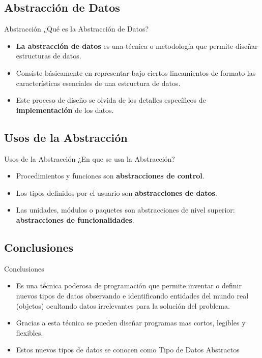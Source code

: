 \documentclass[11pt]{beamer}
\begin{document}
\subsection{Abstracción de Datos}
\begin{frame}{Abstracción}
¿Qué es la Abstracción de Datos?
\begin{itemize}[<+->]
\item \textbf{La abstracción de datos} es una técnica o
metodología que permite diseñar estructuras
de datos.
\item Consiste básicamente en representar bajo
ciertos lineamientos de formato las
características esenciales de una estructura
de datos.
\item Este proceso de diseño se olvida de los
detalles específicos de \textbf{implementación} de
los datos.
\end{itemize}
\end{frame}
\subsection{Usos de la Abstracción}
\begin{frame}{Usos de la Abstracción}
¿En que se usa la Abstracción?
\begin{itemize}[<+->]
\item Procedimientos y funciones son \textbf{abstracciones de control}.
\item Los tipos definidos por el usuario son \textbf{abstracciones de datos}.
\item Las unidades, módulos o paquetes son abstracciones de nivel superior: \textbf{abstracciones de funcionalidades}.
\end{itemize}
\end{frame}
\subsection{Conclusiones}
\begin{frame}
Conclusiones
\begin{itemize}[<+->]
\item Es una técnica poderosa de programación que permite inventar o definir nuevos tipos de datos observando e identificando entidades del mundo real (objetos) ocultando datos irrelevantes para la solución del problema.
\item Gracias a esta técnica se pueden diseñar programas mas cortos, legibles y flexibles.
\item Estos nuevos tipos de datos se conocen como \alert{Tipo de Datos Abstractos}
\end{itemize}
\end{frame}
\end{document}
